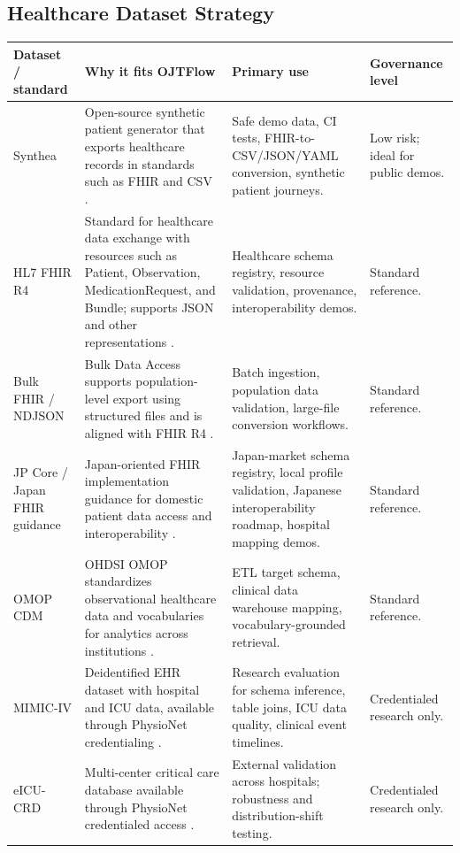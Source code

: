 \subsection{Healthcare Dataset Strategy}

\begin{longtable}{p{}p{}p{}p{}}
\toprule
\textbf{Dataset / standard} & \textbf{Why it fits OJTFlow} & \textbf{Primary use} & \textbf{Governance level} \\
\midrule
Synthea & Open-source synthetic patient generator that exports healthcare records in standards such as FHIR and CSV \cite{synthea}. & Safe demo data, CI tests, FHIR-to-CSV/JSON/YAML conversion, synthetic patient journeys. & Low risk; ideal for public demos. \\
\addlinespace
HL7 FHIR R4 & Standard for healthcare data exchange with resources such as Patient, Observation, MedicationRequest, and Bundle; supports JSON and other representations \cite{fhirR4}. & Healthcare schema registry, resource validation, provenance, interoperability demos. & Standard reference. \\
\addlinespace
Bulk FHIR / NDJSON & Bulk Data Access supports population-level export using structured files and is aligned with FHIR R4 \cite{bulkFHIR}. & Batch ingestion, population data validation, large-file conversion workflows. & Standard reference. \\
\addlinespace
JP Core / Japan FHIR guidance & Japan-oriented FHIR implementation guidance for domestic patient data access and interoperability \cite{jpCore}. & Japan-market schema registry, local profile validation, Japanese interoperability roadmap, hospital mapping demos. & Standard reference. \\
\addlinespace
OMOP CDM & OHDSI OMOP standardizes observational healthcare data and vocabularies for analytics across institutions \cite{omopCDM}. & ETL target schema, clinical data warehouse mapping, vocabulary-grounded retrieval. & Standard reference. \\
\addlinespace
MIMIC-IV & Deidentified EHR dataset with hospital and ICU data, available through PhysioNet credentialing \cite{mimiciv}. & Research evaluation for schema inference, table joins, ICU data quality, clinical event timelines. & Credentialed research only. \\
\addlinespace
eICU-CRD & Multi-center critical care database available through PhysioNet credentialed access \cite{eicu}. & External validation across hospitals; robustness and distribution-shift testing. & Credentialed research only. \\

\end{longtable}
